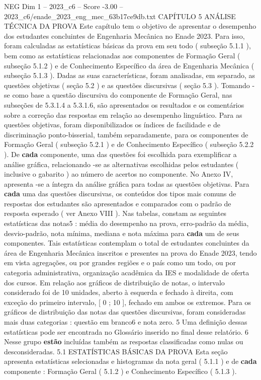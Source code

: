 \begin{textsample}{NEG Dim 1 – 2023\_c6 – Score -3.00 – 2023\_c6/enade\_2023\_eng\_mec\_63b17ce9db.txt}  \label{ex:f1_neg_208}
CAPÍTULO 5 ANÁLISE TÉCNICA DA PROVA Este capítulo tem o objetivo de apresentar o desempenho dos estudantes concluintes de Engenharia Mecânica no Enade 2023.
Para isso, foram calculadas as estatísticas básicas da prova em seu todo ( subseção 5.1.1 ), bem como as estatísticas relacionadas aos componentes de Formação Geral ( subseção 5.1.2 ) e de Conhecimento Específico da área de Engenharia Mecânica ( subseção 5.1.3 ).
Dadas as suas características, foram analisadas, em separado, as questões objetivas ( seção 5.2 ) e as questões discursivas ( seção 5.3 ).
Tomando -se como base a questão discursiva do componente de Formação Geral, nas subseções de 5.3.1.4 a 5.3.1.6, são apresentados os resultados e os comentários sobre a correção das respostas em relação ao desempenho linguístico.
Para as questões objetivas, foram disponibilizados os índices de facilidade e de discriminação ponto-bisserial, também separadamente, para os componentes de Formação Geral ( subseção 5.2.1 ) e de Conhecimento Específico ( subseção 5.2.2 ).
De \textbf{cada} componente, uma das questões foi escolhida para exemplificar a análise gráfica, relacionando -se as alternativas escolhidas pelos estudantes ( inclusive o gabarito ) ao número de acertos no componente.
No Anexo IV, apresenta -se a íntegra da análise gráfica para todas as questões objetivas.
Para \textbf{cada} uma das questões discursivas, os conteúdos dos tipos mais comuns de respostas dos estudantes são apresentados e comparados com o padrão de resposta esperado ( ver Anexo VIII ).
Nas tabelas, constam as seguintes estatísticas das notas5 : média do desempenho na prova, erro-padrão da média, desvio-padrão, nota mínima, mediana e nota máxima para \textbf{cada} um de seus componentes.
Tais estatísticas contemplam o total de estudantes concluintes da área de Engenharia Mecânica inscritos e presentes na prova do Enade 2023, tendo em vista agregações, ou por grandes regiões e o país como um todo, ou por categoria administrativa, organização acadêmica da IES e modalidade de oferta dos cursos.
Em relação aos gráficos de distribuição de notas, o intervalo considerado foi de 10 unidades, aberto à esquerda e fechado à direita, com exceção do primeiro intervalo, [ 0 ; 10 ], fechado em ambos os extremos.
Para os gráficos de distribuição das notas das questões discursivas, foram consideradas mais duas categorias : questão em branco6 e nota zero. 5 Uma definição dessas estatísticas pode ser encontrada no Glossário inserido no final desse relatório. 6 Nesse grupo \textbf{estão} incluídas também as respostas classificadas como nulas ou desconsideradas. 5.1 ESTATÍSTICAS BÁSICAS DA PROVA Esta seção apresenta estatísticas selecionadas e histogramas da nota geral ( 5.1.1 ) e de \textbf{cada} componente : Formação Geral ( 5.1.2 ) e Conhecimento Específico ( 5.1.3 ).

\end{textsample}
